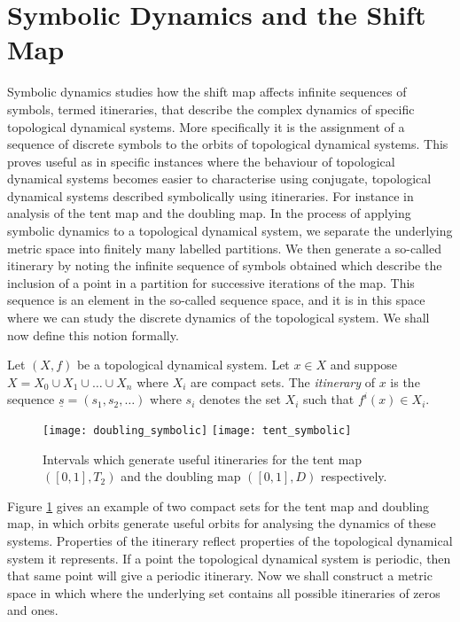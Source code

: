 \section{Symbolic Dynamics and the Shift Map} \label{sec:symbolic-dynamics}
Symbolic dynamics studies how the shift map affects infinite sequences of symbols, termed itineraries, that describe the complex dynamics of specific topological dynamical systems. More specifically it is the assignment of a sequence of discrete symbols to the orbits of topological dynamical systems. This proves useful as in specific instances where the behaviour of topological dynamical systems becomes easier to characterise using conjugate, topological dynamical systems described symbolically using itineraries. For instance in analysis of the tent map and the doubling map. In the process of applying symbolic dynamics to a topological dynamical system, we separate the underlying metric space into finitely many labelled partitions. We then generate a so-called itinerary by noting the infinite sequence of symbols obtained which describe the inclusion of a point in a partition for successive iterations of the map. This sequence is an element in the so-called sequence space, and it is in this space where we can study the discrete dynamics of the topological system. We shall now define this notion formally.

\begin{defn}[Itinerary] \label{defn:itinerary}
    Let $(X, f)$ be a topological dynamical system. Let $x \in X$ and suppose $X = X_0 \cup X_1 \cup \dots \cup X_n$ where $X_i$ are compact sets. The \emph{itinerary} of $x$ is the sequence $\underline{s} = (s_1, s_2, \dots)$ where $s_i$ denotes the set $X_i$ such that $f^i(x) \in X_i$.
\end{defn}

\begin{figure}[h]
    \centering
    \texttt{[image: doubling\_symbolic]}
    \texttt{[image: tent\_symbolic]}
    \caption{Intervals which generate useful itineraries for the tent map $([0, 1], T_2)$ and the doubling map $([0, 1], D)$ respectively.}
    \label{fig:symbolic}
\end{figure}

Figure \ref{fig:symbolic} gives an example of two compact sets for the tent map and doubling map, in which orbits generate useful orbits for analysing the dynamics of these systems. Properties of the itinerary reflect properties of the topological dynamical system it represents. If a point the topological dynamical system is periodic, then that same point will give a periodic itinerary. Now we shall construct a metric space in which where the underlying set contains all possible itineraries of zeros and ones.

